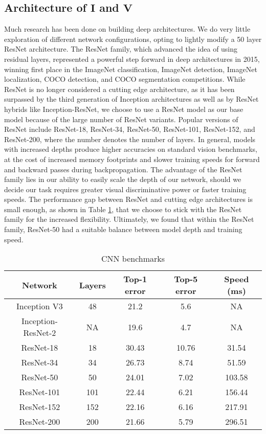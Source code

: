 \subsection{Architecture of $\mathbf{I}$ and $\mathbf{V}$}
Much research has been done on building deep architectures.
We do very little exploration of different network configurations, opting to lightly modify a 50 layer ResNet architecture. The ResNet family, which advanced the idea of using residual layers, represented a powerful step forward in deep architectures in 2015, winning first place in the ImageNet classification, ImageNet detection, ImageNet localization, COCO detection, and COCO segmentation competitions.\cite{He2015} While ResNet is no longer considered a cutting edge architecture, as it has been surpassed by the third generation of Inception architectures as well as by ResNet hybrids like Inception-ResNet, we choose to use a ResNet model as our base model because of the large number of ResNet variants.\cite{He2015}\cite{szegedy2016inception} Popular versions of ResNet include ResNet-18, ResNet-34, ResNet-50, ResNet-101, ResNet-152, and ResNet-200, where the number denotes the number of layers. In general, models with increased depths produce higher accuracies on standard vision benchmarks, at the cost of increased memory footprints and slower training speeds for forward and backward passes during backpropagation. The advantage of the ResNet family lies in our ability to easily scale the depth of our network, should we decide our task requires greater visual discriminative power or faster training speeds. The performance gap between ResNet and cutting edge architectures is small enough, as shown in Table \ref{table:cnn_benchmarks}, that we choose to stick with the ResNet family for the increased flexibility. Ultimately, we found that within the ResNet family, ResNet-50 had a suitable balance between model depth and training speed.

\begin{table}
	\begin{center}
		\begin{tabular}{||c c c c c||} 
			\hline
			Network & Layers & Top-1 error & Top-5 error & Speed (ms) \\ [0.5ex] 
			\hline\hline
			Inception V3 & 48 & 21.2 & 5.6 & NA \\ 
			\hline
			Inception-ResNet-2 & NA & 19.6 & 4.7 & NA \\ 
			\hline
			ResNet-18 & 18 & 30.43 & 10.76 & 31.54 \\ 
			\hline
			ResNet-34 & 34 & 26.73 & 8.74 & 51.59 \\ 
			\hline
			ResNet-50 & 50 & 24.01 & 7.02 & 103.58 \\ 
			\hline
			ResNet-101 & 101 & 22.44 & 6.21 & 156.44 \\ 
			\hline
			ResNet-152 & 152 & 22.16 & 6.16 & 217.91 \\ 
			\hline
			ResNet-200 & 200 & 21.66 & 5.79 & 296.51 \\
			\hline
		\end{tabular}
		\caption{CNN benchmarks}
		\label{table:cnn_benchmarks}
	\end{center}
\end{table}

